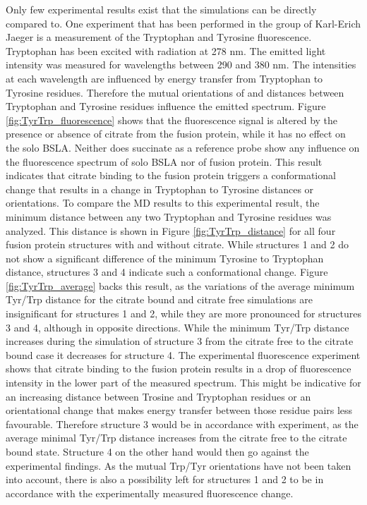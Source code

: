 \documentclass[english, a4paper, 12pt, titlepage, draft]{article}
\begin{document}
Only few experimental results exist that the simulations can be directly compared to. 
One experiment that has been performed in the group of Karl-Erich Jaeger is a measurement of the Tryptophan and Tyrosine fluorescence.
Tryptophan has been excited with radiation at 278 nm.
The emitted light intensity was measured for wavelengths between 290 and 380 nm.
The intensities at each wavelength are influenced by energy transfer from Tryptophan to Tyrosine residues.
Therefore the mutual orientations of and distances between Tryptophan and Tyrosine residues influence the emitted spectrum.
Figure \ref{fig:TyrTrp_fluorescence} shows that the fluorescence signal is altered by the presence or absence of citrate from the fusion protein, while it has no effect on the solo BSLA.
Neither does succinate as a reference probe show any influence on the fluorescence spectrum of solo BSLA nor of fusion protein.
This result indicates that citrate binding to the fusion protein triggers a conformational change that results in a change in Tryptophan to Tyrosine distances or orientations.
To compare the MD results to this experimental result, the minimum distance between any two Tryptophan and Tyrosine residues was analyzed.
This distance is shown in Figure \ref{fig:TyrTrp_distance} for all four fusion protein structures with and without citrate.
While structures 1 and 2 do not show a significant difference of the minimum Tyrosine to Tryptophan distance, structures 3 and 4 indicate such a conformational change.
Figure \ref{fig:TyrTrp_average} backs this result, as the variations of the average minimum Tyr/Trp distance for the citrate bound and citrate free simulations are insignificant for structures 1 and 2, while they are more pronounced for structures 3 and 4, although in opposite directions.
While the minimum Tyr/Trp distance increases during the simulation of structure 3 from the citrate free to the citrate bound case it decreases for structure 4.
The experimental fluorescence experiment shows that citrate binding to the fusion protein results in a drop of fluorescence intensity in the lower part of the measured spectrum.
This might be indicative for an increasing distance between Trosine and Tryptophan residues or an orientational change that makes energy transfer between those residue pairs less favourable.
Therefore structure 3 would be in accordance with experiment, as the average minimal Tyr/Trp distance increases from the citrate free to the citrate bound state.
Structure 4 on the other hand would then go against the experimental findings.
As the mutual Trp/Tyr orientations have not been taken into account, there is also a possibility left for structures 1 and 2 to be in accordance with the experimentally measured fluorescence change.
\end{document}

